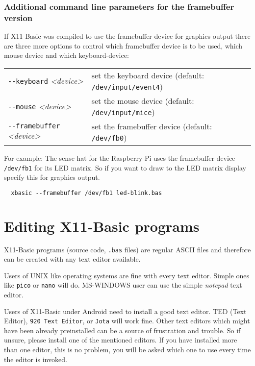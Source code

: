 \subsubsection*{Additional command line parameters for the framebuffer version}

If X11-Basic was compiled to use the framebuffer device for graphics output there are
three more options to control which framebuffer device is to be used, which mouse 
device and which keyboard-device:

\begin{longtable}{lp{11cm}}
\verb|--keyboard| {\it<device>} & set the keyboard device (default: \verb|/dev/input/event4|)\\
\verb|--mouse|    {\it<device>} & set the mouse device (default: \verb|/dev/input/mice|)\\
\verb|--framebuffer| {\it<device>} & set the framebuffer device (default: \verb|/dev/fb0|)\\
\end{longtable}

For example: The sense hat for the Raspberry Pi uses the framebuffer device
\verb|/dev/fb1| for its LED matrix. So if you want to draw to the LED matrix 
display specify this for graphics output.
\begin{mdframed}[hidealllines=true,backgroundcolor=black!20]
\begin{verbatim}
  xbasic --framebuffer /dev/fb1 led-blink.bas
\end{verbatim}
\end{mdframed}


\section{Editing X11-Basic programs}

X11-Basic programs (source code, \verb|.bas| files) are regular ASCII files and
therefore can be created with any text editor available.  

Users of UNIX like operating systems are fine with every text editor. Simple 
ones like \verb|pico| or \verb|nano| will do. MS-WINDOWS user can use the simple 
{\it notepad} text editor.

Users of X11-Basic under Android need to install a good text editor. TED (Text
Editor), \verb|920 Text Editor|, or \verb|Jota| will work fine. Other text
editors which might have been already preinstalled can be a source of
frustration and trouble. So if unsure, please install one of the mentioned
editors. If you have installed more than one editor,
this is no problem, you will be asked which one to use every time the editor
is invoked. 

